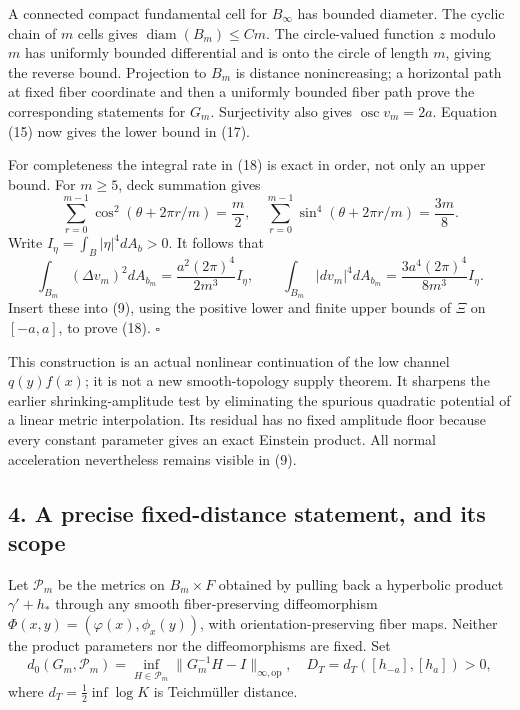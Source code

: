 \documentclass[
  11pt,
]{article}
\begin{document}
A connected compact fundamental cell for \(B_\infty\) has bounded
diameter. The cyclic chain of \(m\) cells gives
\(\operatorname{diam}(B_m)\le C m\). The circle-valued function \(z\)
modulo \(m\) has uniformly bounded differential and is onto the circle
of length \(m\), giving the reverse bound. Projection to \(B_m\) is
distance nonincreasing; a horizontal path at fixed fiber coordinate and
then a uniformly bounded fiber path prove the corresponding statements
for \(G_m\). Surjectivity also gives \(\operatorname{osc}v_m=2a\).
Equation (15) now gives the lower bound in (17).

For completeness the integral rate in (18) is exact in order, not only
an upper bound. For \(m\ge5\), deck summation gives \[
 \sum_{r=0}^{m-1}\cos^2(\theta+2\pi r/m)=\frac m2,
 \quad
 \sum_{r=0}^{m-1}\sin^4(\theta+2\pi r/m)=\frac{3m}{8}.
 \tag{20}
\] Write \(I_\eta=\int_B|\eta|^4dA_b>0\). It follows that \[
 \int_{B_m}(\Delta v_m)^2dA_{b_m}
       =\frac{a^2(2\pi)^4}{2m^3}I_\eta,
 \qquad
 \int_{B_m}|dv_m|^4dA_{b_m}
       =\frac{3a^4(2\pi)^4}{8m^3}I_\eta.
 \tag{21}
\] Insert these into (9), using the positive lower and finite upper
bounds of \(\Xi\) on \([-a,a]\), to prove (18). \(\square\)

This construction is an actual nonlinear continuation of the low channel
\(q(y)f(x)\); it is not a new smooth-topology supply theorem. It
sharpens the earlier shrinking-amplitude test by eliminating the
spurious quadratic potential of a linear metric interpolation. Its
residual has no fixed amplitude floor because every constant parameter
gives an exact Einstein product. All normal acceleration nevertheless
remains visible in (9).

\hypertarget{a-precise-fixed-distance-statement-and-its-scope}{%
\subsection{4. A precise fixed-distance statement, and its
scope}\label{a-precise-fixed-distance-statement-and-its-scope}}

Let \(\mathscr P_m\) be the metrics on \(B_m\times F\) obtained by
pulling back a hyperbolic product \(\gamma'+h_*\) through any smooth
fiber-preserving diffeomorphism \(\Phi(x,y)=(\varphi(x),\phi_x(y))\),
with orientation-preserving fiber maps. Neither the product parameters
nor the diffeomorphisms are fixed. Set \[
 d_0(G_m,\mathscr P_m)
  =\inf_{H\in\mathscr P_m}\|G_m^{-1}H-I\|_{\infty,\mathrm{op}},
 \quad
 D_T=d_T([h_{-a}],[h_a])>0,
 \tag{22}
\] where \(d_T=\tfrac12\inf\log K\) is Teichmüller distance.
\end{document}
